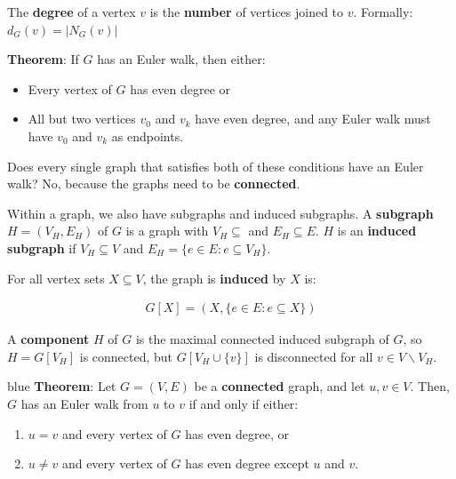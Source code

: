 \documentclass[11pt,a4paper,titlepage,dvipsnames,cmyk]{scrartcl}
\begin{document}
The \textbf{degree} of a vertex $v$ is the \textbf{number} of vertices
joined to $v$. Formally: $d_G(v) = |N_G(v)|$

\textbf{Theorem}: If $G$ has an Euler walk, then either:
\begin{itemize}
    \item Every vertex of $G$ has even degree or
    \item All but two vertices $v_0$ and $v_k$ have even degree, and any
        Euler walk must have $v_0$ and $v_k$ as endpoints.
\end{itemize}

Does every single graph that satisfies both of these conditions have an
Euler walk? No, because the graphs need to be \textbf{connected}.

Within a graph, we also have subgraphs and induced subgraphs. A
\textbf{subgraph} $H = (V_H, E_H)$ of $G$ is a graph with $V_H \subseteq$
and $E_H \subseteq E$. $H$ is an \textbf{induced subgraph} if $V_H
\subseteq V$ and $E_H = \{ e \in E : e \subseteq V_H\}$.

For all vertex sets $X \subseteq V$, the graph is \textbf{induced} by $X$
is:

\begin{center}
    \begin{align*}
        G[X] = (X, \{e \in E: e \subseteq X \})
    \end{align*}
\end{center}

A \textbf{component} $H$ of $G$ is the maximal connected induced subgraph
of $G$, so $H = G[V_H]$ is connected, but $G[V_H \cup \{v\}]$ is
disconnected for all $v \in V \backslash V_H$.

\begin{blue}{blue}
    \textbf{Theorem}: Let $G = (V,E)$ be a \textbf{connected} graph, and
    let $u,v \in V$. Then, $G$ has an Euler walk from $u$ to $v$ if and
    only if either:
    \begin{enumerate}
        \item $u = v$ and every vertex of $G$ has even degree, or
        \item $u \not = v$ and every vertex of $G$ has even degree except
            $u$ and $v$.
    \end{enumerate}
\end{blue}
\end{document}
